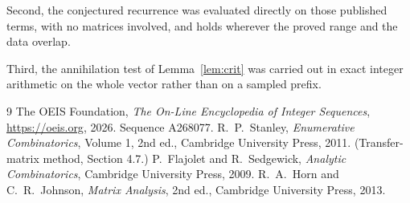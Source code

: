 \documentclass[11pt,a4paper]{article}
\theoremstyle{plain}
\theoremstyle{definition}
\begin{document}
Second, the conjectured recurrence was evaluated directly on those published terms, with no
matrices involved, and holds wherever the proved range and the data overlap.

Third, the annihilation test of Lemma~\ref{lem:crit} was carried out in exact integer
arithmetic on the whole vector rather than on a sampled prefix.

\begin{thebibliography}{9}
 The OEIS Foundation, \emph{The On-Line Encyclopedia of Integer
Sequences}, \url{https://oeis.org}, 2026. Sequence A268077.
 R.~P.~Stanley, \emph{Enumerative Combinatorics}, Volume 1, 2nd ed.,
Cambridge University Press, 2011. (Transfer-matrix method, Section 4.7.)
 P.~Flajolet and R.~Sedgewick, \emph{Analytic Combinatorics}, Cambridge
University Press, 2009.
 R.~A.~Horn and C.~R.~Johnson, \emph{Matrix Analysis}, 2nd ed., Cambridge
University Press, 2013.
\end{thebibliography}
\end{document}
